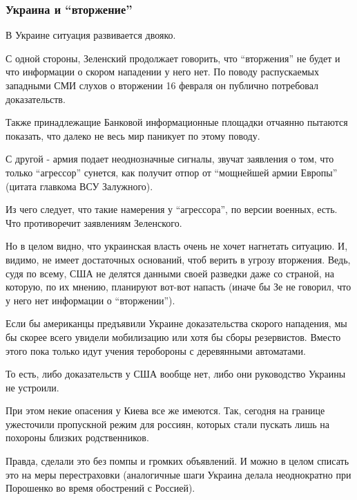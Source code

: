  
 
 
 
 

\subsubsection{Украина и \enquote{вторжение}}

В Украине ситуация развивается двояко. 

С одной стороны, Зеленский продолжает говорить, что \enquote{вторжения} не
будет и что информации о скором нападении у него нет. По поводу распускаемых
западными СМИ слухов о вторжении 16 февраля он публично потребовал
доказательств.

Также принадлежащие Банковой информационные площадки отчаянно пытаются
показать, что далеко не весь мир паникует по этому поводу. 

С другой - армия подает неоднозначные сигналы, звучат заявления о том, что
только \enquote{агрессор} сунется, как получит отпор от \enquote{мощнейшей
армии Европы} (цитата главкома ВСУ Залужного). 

Из чего следует, что такие намерения у \enquote{агрессора}, по версии военных,
есть. Что противоречит заявлениям Зеленского. 

Но в целом видно, что украинская власть очень не хочет нагнетать ситуацию. И,
видимо, не имеет достаточных оснований, чтоб верить в угрозу вторжения. Ведь,
судя по всему, США не делятся данными своей разведки даже со страной, на
которую, по их мнению, планируют вот-вот напасть (иначе бы Зе не говорил, что у
него нет информации о \enquote{вторжении}). 

Если бы американцы предъявили Украине доказательства скорого нападения, мы бы
скорее всего увидели мобилизацию или хотя бы сборы резервистов. Вместо этого
пока только идут учения теробороны с деревянными автоматами. 

То есть, либо доказательств у США вообще нет, либо они руководство Украины не
устроили. 

При этом некие опасения у Киева все же имеются. Так, сегодня на границе
ужесточили пропускной режим для россиян, которых стали пускать лишь на похороны
близких родственников.

Правда, сделали это без помпы и громких объявлений. И можно в целом списать это
на меры перестраховки (аналогичные шаги Украина делала неоднократно при
Порошенко во время обострений с Россией). 
